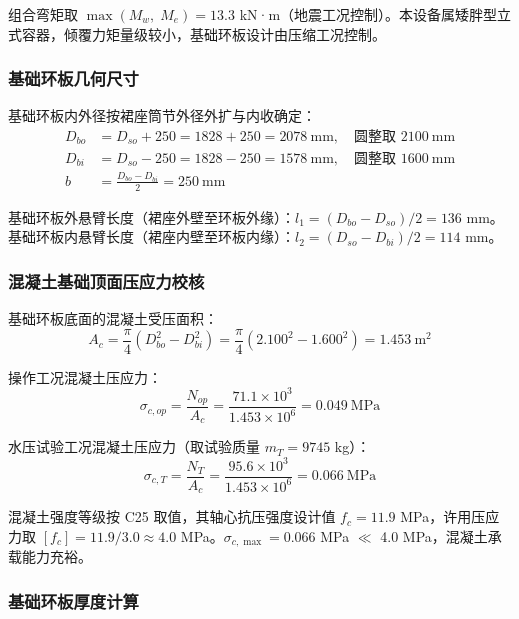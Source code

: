 组合弯矩取 $\max(M_w,\;M_e) = 13.3$ kN·m（地震工况控制）。本设备属矮胖型立式容器，倾覆力矩量级较小，基础环板设计由压缩工况控制。

\subsubsection{基础环板几何尺寸}

基础环板内外径按裙座筒节外径外扩与内收确定：
\begin{align}
D_{bo} &= D_{so} + 250 = 1828 + 250 = 2078\ \text{mm},\quad\text{圆整取 } 2100\ \text{mm} \\
D_{bi} &= D_{so} - 250 = 1828 - 250 = 1578\ \text{mm},\quad\text{圆整取 } 1600\ \text{mm} \\
b      &= \frac{D_{bo} - D_{bi}}{2} = 250\ \text{mm}
\end{align}

基础环板外悬臂长度（裙座外壁至环板外缘）：$l_1 = (D_{bo} - D_{so})/2 = 136$ mm。\\
基础环板内悬臂长度（裙座内壁至环板内缘）：$l_2 = (D_{so} - D_{bi})/2 = 114$ mm。

\subsubsection{混凝土基础顶面压应力校核}

基础环板底面的混凝土受压面积：
\begin{equation}
A_c = \frac{\pi}{4}\left(D_{bo}^2 - D_{bi}^2\right) = \frac{\pi}{4}\left(2.100^2 - 1.600^2\right) = 1.453\ \text{m}^2
\end{equation}

操作工况混凝土压应力：
\begin{equation}
\sigma_{c,op} = \frac{N_{op}}{A_c} = \frac{71.1 \times 10^3}{1.453 \times 10^6} = 0.049\ \text{MPa}
\end{equation}

水压试验工况混凝土压应力（取试验质量 $m_T = 9745$ kg）：
\begin{equation}
\sigma_{c,T} = \frac{N_T}{A_c} = \frac{95.6 \times 10^3}{1.453 \times 10^6} = 0.066\ \text{MPa}
\end{equation}

混凝土强度等级按 C25 取值，其轴心抗压强度设计值 $f_c = 11.9$ MPa，许用压应力取 $[f_c] = 11.9/3.0 \approx 4.0$ MPa。$\sigma_{c,\max} = 0.066$ MPa $\ll$ 4.0 MPa，混凝土承载能力充裕。

\subsubsection{基础环板厚度计算}


